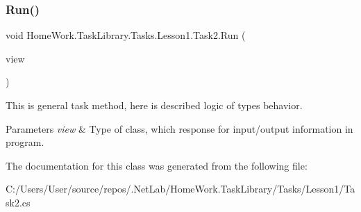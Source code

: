 \subsubsection{\texorpdfstring{Run()}{Run()}}
{\footnotesize\ttfamily void Home\+Work.\+Task\+Library.\+Tasks.\+Lesson1.\+Task2.\+Run (\begin{DoxyParamCaption}\item[{I\+Information}]{view }\end{DoxyParamCaption})}



This is general task method, here is described logic of types behavior. 


\begin{DoxyParams}{Parameters}
{\em view} & Type of class, which response for input/output information in program.\\
\hline
\end{DoxyParams}


The documentation for this class was generated from the following file\+:\begin{DoxyCompactItemize}
\item 
C\+:/\+Users/\+User/source/repos/.\+Net\+Lab/\+Home\+Work.\+Task\+Library/\+Tasks/\+Lesson1/Task2.\+cs\end{DoxyCompactItemize}
